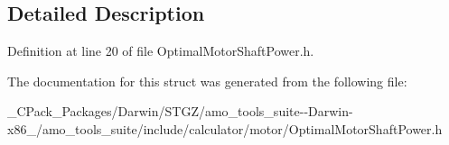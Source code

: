 \subsection{Detailed Description}


Definition at line 20 of file Optimal\+Motor\+Shaft\+Power.\+h.



The documentation for this struct was generated from the following file\+:\begin{DoxyCompactItemize}
\item 
\+\_\+\+C\+Pack\+\_\+\+Packages/\+Darwin/\+S\+T\+G\+Z/amo\+\_\+tools\+\_\+suite-\/-\/\+Darwin-\/x86\+\_/amo\+\_\+tools\+\_\+suite/include/calculator/motor/Optimal\+Motor\+Shaft\+Power.\+h\end{DoxyCompactItemize}
